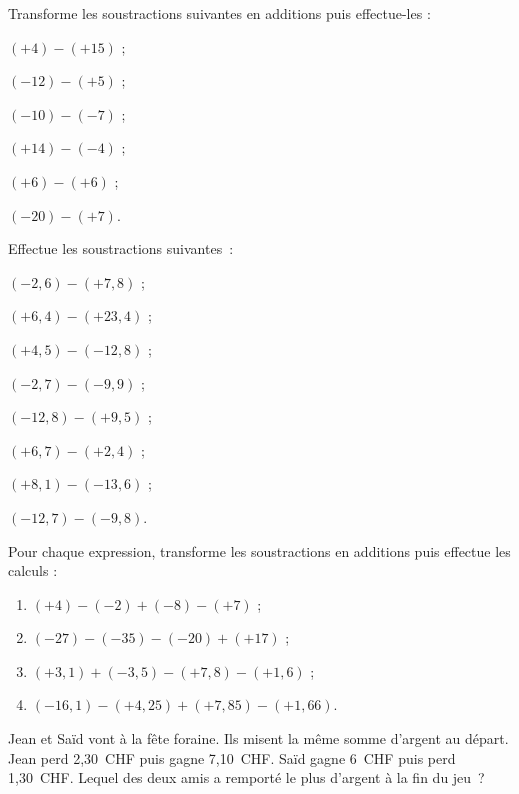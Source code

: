 \begin{exercice}
Transforme les soustractions suivantes en additions puis effectue-les :
\begin{colenumerate}{2}
 \item $(+ 4) - (+ 15)$ ;
 \item $(- 12) - (+ 5)$ ;
 \item $(- 10) - (- 7)$ ;
 \item $(+ 14) - (- 4)$ ;
 \item $(+ 6) - (+ 6)$ ;
 \item $(- 20) - (+ 7)$.
 \end{colenumerate}
\end{exercice}


\begin{exercice}
Effectue les soustractions suivantes :
\begin{colenumerate}{2}
 \item $(- 2,6) - (+ 7,8)$ ;
 \item $(+ 6,4) - (+ 23,4)$ ;
 \item $(+ 4,5) - (- 12,8)$ ;
 \item $(- 2,7) - (- 9,9)$ ;
 \item $(- 12,8) - (+ 9,5)$ ;
 \item $(+ 6,7) - (+ 2,4)$ ;
 \item $(+ 8,1) - (- 13,6)$ ;
 \item $(- 12,7) - (- 9,8)$.
 \end{colenumerate}
\end{exercice}


\begin{exercice}
Pour chaque expression, transforme les soustractions en additions puis effectue les calculs :
\begin{enumerate}
 \item $(+ 4) - (- 2) + (- 8) - (+ 7)$ ;
 \item $(- 27) - (- 35) - (- 20) + (+ 17)$ ;
 \item $(+ 3,1) + (- 3,5) - (+ 7,8) - (+ 1,6)$ ;
 \item $(- 16,1) - (+ 4,25) + (+ 7,85) - (+ 1,66)$.
 \end{enumerate}
\end{exercice}


\begin{exercice}
Jean et Saïd vont à la fête foraine. Ils misent la même somme d'argent au départ. Jean perd 2,30 CHF puis gagne 7,10 CHF. Saïd gagne 6 CHF puis perd 1,30 CHF. Lequel des deux amis a remporté le plus d'argent à la fin du jeu ?
\end{exercice}


